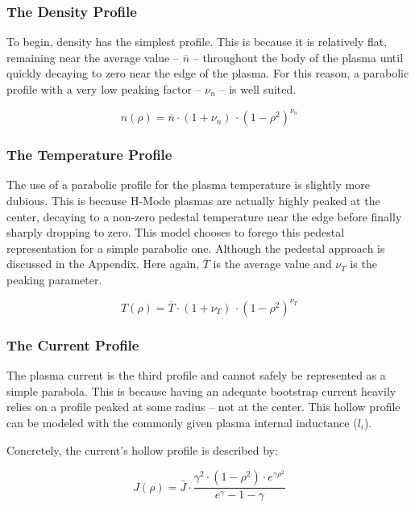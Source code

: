 \documentclass[11pt]{book}
\begin{document}
\subsubsection{The Density Profile}

To begin, density has the simplest profile. This is because it is relatively flat, remaining near the average value -- $\overline n$ -- throughout the body of the plasma until quickly decaying to zero near the edge of the plasma. For this reason, a parabolic profile with a very low peaking factor -- $\nu_n$ -- is well suited.

\begin{equation}
	n(\rho) = \overline n \cdot ( 1 + \nu_n ) \, \cdot ( 1 - \rho ^ 2 ) ^ {\nu_n}
\end{equation}

\subsubsection{The Temperature Profile}

The use of a parabolic profile for the plasma temperature is slightly more dubious. This is because H-Mode plasmas are actually highly peaked at the center, decaying to a non-zero pedestal temperature near the edge before finally sharply dropping to zero. This model chooses to forego this pedestal representation for a simple parabolic one. Although the pedestal approach is discussed in the Appendix. Here again, $\overline T$ is the average value and $\nu_T$ is the peaking parameter.

\begin{equation}
	T(\rho) = \overline T \cdot ( 1 + \nu_T ) \, \cdot ( 1 - \rho ^ 2 ) ^ {\nu_T}
\end{equation}

\subsubsection{The Current Profile}

The plasma current is the third profile and cannot safely be represented as a simple parabola. This is because having an adequate bootstrap current heavily relies on a profile peaked at some radius -- not at the center. This hollow profile can be modeled with the commonly given plasma internal inductance ($l_i$).

Concretely, the current's hollow profile is described by:

\begin{equation}
	J(\rho) = \bar{J} \cdot \frac{ \gamma ^ 2 \cdot ( 1 - \rho ^ 2 ) \cdot e^{ \gamma \rho^2 } }{ e^\gamma - 1 - \gamma}
\end{equation}
\end{document}
